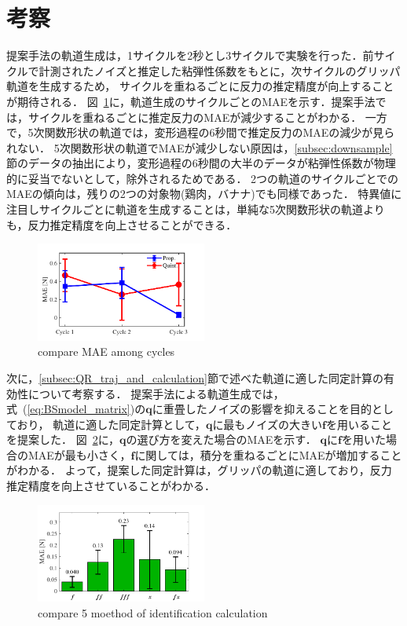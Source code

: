 \documentclass[a4paper]{jarticle}
\begin{document}
\section{考察}
提案手法の軌道生成は，1サイクルを2秒とし3サイクルで実験を行った．前サイクルで計測されたノイズと推定した{\color{red}粘弾性係数}をもとに，次サイクルのグリッパ軌道を生成するため，
サイクルを重ねるごとに反力の推定精度が向上することが期待される．
図~\ref{fig:compare_cycle_MAE}に，軌道生成のサイクルごとのMAEを示す．提案手法では，サイクルを重ねるごとに推定反力のMAEが減少することがわかる．
一方で，5次関数形状の軌道では，変形過程の6秒間で推定反力のMAEの減少が見られない．
5次関数形状の軌道でMAEが減少しない原因は，\ref{subsec:downsample}節のデータの抽出により，変形過程の6秒間の大半のデータが{\color{red}粘弾性係数}が物理的に妥当でないとして，除外されるためである．
2つの軌道のサイクルごとでのMAEの傾向は，残りの2つの対象物{\color{red}(鶏肉，バナナ)}でも同様であった．
特異値に注目しサイクルごとに軌道を生成することは，単純な5次関数形状の軌道よりも，反力推定精度を向上させることができる．
\begin{figure}[htbp]
    \centering
    \includegraphics[width=0.5\textwidth]{compare_cycle_MAE.pdf}
    \caption{compare MAE among cycles}
    \label{fig:compare_cycle_MAE}
\end{figure}

次に，\ref{subsec:QR_traj_and_calculation}節で述べた軌道に適した同定計算の有効性について考察する．
提案手法による軌道生成では，式~(\ref{eq:BSmodel_matrix})の$\mathbf{q}$に重畳したノイズの影響を抑えることを目的としており，
軌道に適した同定計算として，$\mathbf{q}$に最もノイズの大きい$\boldsymbol{f}$を用いることを提案した．
図~\ref{fig:compare_select5mode}に，$\mathbf{q}$の選び方を変えた場合のMAEを示す．
$\mathbf{q}$に$\boldsymbol{f}$を用いた場合のMAEが最も小さく，$\boldsymbol{{f}}$に関しては，積分を重ねるごとにMAEが増加することがわかる．
よって，提案した同定計算は，グリッパの軌道に適しており，反力推定精度を向上させていることがわかる．
\begin{figure}[htbp]
    \centering
    \includegraphics[width=0.5\textwidth]{select_different_q.pdf}
    \caption{compare 5 moethod of identification calculation}
    \label{fig:compare_select5mode}
\end{figure}
\end{document}
